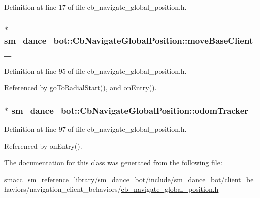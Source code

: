 Definition at line 17 of file cb\+\_\+navigate\+\_\+global\+\_\+position.\+h.

\subsubsection[{\texorpdfstring{move\+Base\+Client\+\_\+}{moveBaseClient_}}]{$\ast$ sm\+\_\+dance\+\_\+bot\+::\+Cb\+Navigate\+Global\+Position\+::move\+Base\+Client\+\_\+\hspace{0.3cm}{\ttfamily [private]}}\hypertarget{classsm__dance__bot_1_1CbNavigateGlobalPosition_a1d94ab79bdffa994748287c09bd8c18e}{}\label{classsm__dance__bot_1_1CbNavigateGlobalPosition_a1d94ab79bdffa994748287c09bd8c18e}


Definition at line 95 of file cb\+\_\+navigate\+\_\+global\+\_\+position.\+h.



Referenced by go\+To\+Radial\+Start(), and on\+Entry().

\subsubsection[{\texorpdfstring{odom\+Tracker\+\_\+}{odomTracker_}}]{$\ast$ sm\+\_\+dance\+\_\+bot\+::\+Cb\+Navigate\+Global\+Position\+::odom\+Tracker\+\_\+\hspace{0.3cm}{\ttfamily [private]}}\hypertarget{classsm__dance__bot_1_1CbNavigateGlobalPosition_a1d9fbebe8579cdef9485698e99ca8a41}{}\label{classsm__dance__bot_1_1CbNavigateGlobalPosition_a1d9fbebe8579cdef9485698e99ca8a41}


Definition at line 97 of file cb\+\_\+navigate\+\_\+global\+\_\+position.\+h.



Referenced by on\+Entry().



The documentation for this class was generated from the following file\+:\begin{DoxyCompactItemize}
\item 
smacc\+\_\+sm\+\_\+reference\+\_\+library/sm\+\_\+dance\+\_\+bot/include/sm\+\_\+dance\+\_\+bot/client\+\_\+behaviors/navigation\+\_\+client\+\_\+behaviors/\hyperlink{cb__navigate__global__position_8h}{cb\+\_\+navigate\+\_\+global\+\_\+position.\+h}\end{DoxyCompactItemize}
